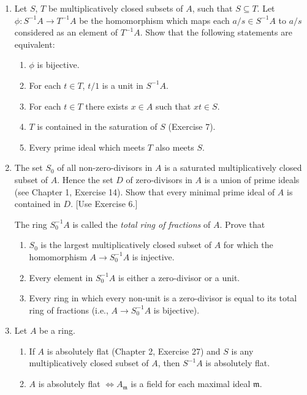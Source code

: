 \begin{enumerate}
\item Let $S$, $T$ be multiplicatively closed subsets of $A$, such that $S\subseteq T$. Let $\phi:S^{-1}A\longrightarrow T^{-1}A$ be the homomorphism which maps each $a/s\in S^{-1}A$ to $a/s$ considered as an element of $T^{-1}A$. Show that the following statements are equivalent:
\begin{enumerate}
\renewcommand{\labelenumii}{\roman{enumii})}
\item $\phi$ is bijective.
\item For each $t\in T$, $t/1$ is a unit in $S^{-1}A$.
\item For each $t\in T$ there exists $x\in A$ such that $xt\in S$.
\item $T$ is contained in the saturation of $S$ (Exercise 7).
\item Every prime ideal which meets $T$ also meets $S$.
\end{enumerate}

\item The set $S_0$ of all non-zero-divisors in $A$ is a saturated multiplicatively closed subset of $A$. Hence the set $D$ of zero-divisors in $A$ is a union of prime ideals (see Chapter 1, Exercise 14). Show that every minimal prime ideal of $A$ is contained in $D$. [Use Exercise 6.]

The ring $S_0^{-1}A$ is called the \textit{total ring of fractions} of $A$. Prove that
\begin{enumerate}
\renewcommand{\labelenumii}{\roman{enumii})}
\item $S_0$ is the largest multiplicatively closed subset of $A$ for which the homomorphism $A\longrightarrow S_0^{-1}A$ is injective.
\item Every element in $S_0^{-1}A$ is either a zero-divisor or a unit.
\item Every ring in which every non-unit is a zero-divisor is equal to its total ring of fractions (i.e., $A\longrightarrow S_0^{-1}A$ is bijective).
\end{enumerate}

\item Let $A$ be a ring.
\begin{enumerate}
\renewcommand{\labelenumii}{\roman{enumii})}
\item If $A$ is absolutely flat (Chapter 2, Exercise 27) and $S$ is any multiplicatively closed subset of $A$, then $S^{-1}A$ is absolutely flat.
\item $A$ is absolutely flat $\Longleftrightarrow A_{\mathfrak m}$ is a field for each maximal ideal $\mathfrak m$.
\end{enumerate}


\end{enumerate}
